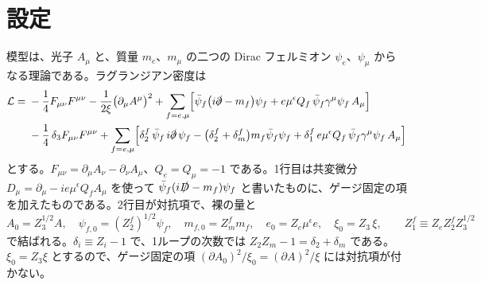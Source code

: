 \documentclass[a4paper,10pt]{ltjsarticle}
\begin{document}
\section{設定}\label{sec:setup}

模型は、光子 $A_\mu$ と、質量 $m_e$、$m_\mu$ の二つの Dirac フェルミオン $\psi_e$、$\psi_\mu$ からなる理論である。ラグランジアン密度は
\begin{equation}
\begin{aligned}
\mathcal{L}={}&-\frac14F_{\mu\nu}F^{\mu\nu}-\frac{1}{2\xi}\bigl(\partial_\mu A^\mu\bigr)^2
+\sum_{f=e,\mu}\Bigl[\bar\psi_f\bigl(i\slashed\partial-m_f\bigr)\psi_f+e\mu^{\epsilon}Q_f\,\bar\psi_f\gamma^\mu\psi_f\,A_\mu\Bigr]\\
&-\frac14\,\delta_3F_{\mu\nu}F^{\mu\nu}
+\sum_{f=e,\mu}\Bigl[\delta_2^f\,\bar\psi_f\,i\slashed\partial\,\psi_f-\bigl(\delta_2^f+\delta_m^f\bigr)m_f\bar\psi_f\psi_f+\delta_1^f\,e\mu^{\epsilon}Q_f\,\bar\psi_f\gamma^\mu\psi_f\,A_\mu\Bigr]
\end{aligned}
\label{eq:L}
\end{equation}
とする。$F_{\mu\nu}=\partial_\mu A_\nu-\partial_\nu A_\mu$、$Q_e=Q_\mu=-1$ である。1行目は共変微分 $D_\mu=\partial_\mu-ie\mu^\epsilon Q_fA_\mu$ を使って $\bar\psi_f(i\slashed D-m_f)\psi_f$ と書いたものに、ゲージ固定の項を加えたものである。2行目が対抗項で、裸の量と
\begin{equation*}
A_0=Z_3^{1/2}A,\quad \psi_{f,0}=(Z_2^f)^{1/2}\psi_f,\quad m_{f,0}=Z_m^fm_f,\quad e_0=Z_e\mu^\epsilon e,\quad \xi_0=Z_3\,\xi,\qquad
Z_1^f\equiv Z_eZ_2^fZ_3^{1/2}
\end{equation*}
で結ばれる。$\delta_i\equiv Z_i-1$ で、1ループの次数では $Z_2Z_m-1=\delta_2+\delta_m$ である。$\xi_0=Z_3\xi$ とするので、ゲージ固定の項 $(\partial A_0)^2/\xi_0=(\partial A)^2/\xi$ には対抗項が付かない。
\end{document}
